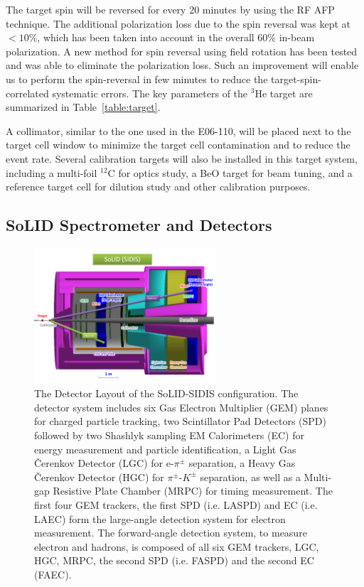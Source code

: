 The target spin will be reversed for every 20 minutes by using the RF AFP
technique. The additional polarization loss due to the spin reversal was kept
at $<10\%$, which has been taken into account in the overall 60\% in-beam
polarization. A new method for spin reversal using field rotation has been
tested and was able to eliminate the polarization loss. Such an improvement
will enable us to perform the spin-reversal in few minutes to reduce the
target-spin-correlated systematic errors. The key parameters of the
$\mathrm{^{3}He}$ target are summarized in Table~\ref{table:target}.
  
A collimator, similar to the one used in the E06-110, will be placed next to
the target cell window to minimize the target cell contamination and to reduce
the event rate. Several calibration targets will also be installed in this
target system, including a multi-foil $^{12}$C for optics study, a BeO target
for beam tuning, and a reference target cell for dilution study and other
calibration purposes.
  
\subsection {SoLID Spectrometer and Detectors} 

\begin{figure}[!ht]
 \begin{center}
  \includegraphics[width=0.6\textwidth]{./figures/SoLID_SIDIS_setup.pdf}
   \caption[The Detector Layout of the SoLID-SIDIS
     configuration]{\footnotesize{The Detector Layout of the SoLID-SIDIS
       configuration. The detector system includes six Gas Electron Multiplier
       (GEM) planes for charged particle tracking, two Scintillator Pad
       Detectors (SPD) followed by two Shashlyk sampling EM Calorimeters (EC)
       for energy measurement and particle identification, a Light Gas
       \v{C}erenkov Detector (LGC) for e-$\pi^{\pm}$ separation, a Heavy Gas
       \v{C}erenkov Detector (HGC) for $\pi^{\pm}$-$K^{\pm}$ separation, as
       well as a Multi-gap Resistive Plate Chamber (MRPC) for timing
       measurement. The first four GEM trackers, the first SPD (i.e. LASPD) and
       EC (i.e. LAEC) form the large-angle detection system for electron
       measurement. The forward-angle detection system, to measure electron and
       hadrons, is composed of all six GEM trackers, LGC, HGC, MRPC, the second
       SPD (i.e. FASPD) and the second EC (FAEC).}}
   \label{solid_sidis}
 \end{center}
\end{figure}

